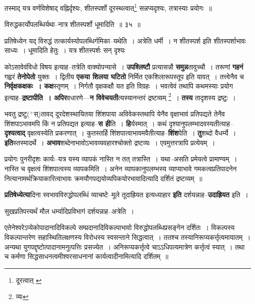 \documentclass[article,12pt,a4paper]{memoir}
\newcommand{\add}[1]{($^{+}$#1)}
\begin{document}
	  \pstart तस्माद् यत्र वर्णविशेषाद् वह्निर्दृश्यः, शीतस्पर्शो दूरस्थत्वात्\footnote{दूरत्वात् \cite{dp-msB} \cite{dp-msD}} सन्नप्यदृश्यः, तत्रास्याः प्रयोगः ॥
	\pend
       
	  \bigskip
	  \begingroup
	

	  \pstart विरुद्धकार्योपलब्धिर्यथा--नात्र शीतस्पर्शो धूमादिति ॥ ३५ ॥
	\pend
      
	  \endgroup
	 

	  \pstart प्रतिषेध्येन यद् विरुद्धं तत्कार्यस्योपलब्धिर्गमिका--यथेति । अत्रेति धर्मी । न शीतस्पर्श इति शीतस्पर्शाभावः साध्यः । धूमादिति हेतुः । यत्र शीतस्पर्शः सन् दृश्यः
	\pend
      
	  \endgroup
	

	  \pstart कोऽसावेवंविधो विषय इत्याह--तत्रेति वाक्योपन्यासे । \textbf{उपश्लिष्टौ} प्रत्यासन्नौ \textbf{समुन्न}तावुच्चौ । तरूणां \textbf{गहनं} गह्वरं \textbf{तेनोपेतो} युक्तः । द्वितीय \textbf{एकया शिलया घटितो} निर्मित एकशिलारूपस्तूप इति यावत् । तत्त्वेनैव च \textbf{निर्वृक्षकक्षकः । कक्ष}स्तृणम् । निर्गतौ वृक्षकक्षौ यत इति विग्रहः । भवत्वेवं तथापि कथमस्याः प्रयोग इत्याह--\textbf{द्रष्टापीति । अपिर}वधारणे—\textbf{न विवेचयती}त्यस्यानन्तरं द्रष्टव्यम् \footnote{व्यः} । \textbf{तस्य} तादृशस्य द्रष्टुः ।
	\pend
      

	  \pstart भवतु द्रष्टु\add{स्}तावद् दूरदेशस्थायितया शिंशपाया अविवेकस्तथापि येनैव वृक्षाभावं प्रतिपद्यते तेनैव शिंशपाऽभावमपि किं न प्रतिपद्यत इत्याह--\textbf{स ही}ति । \textbf{हि}र्यस्मात् । कथं दृश्यानुपलम्भादवस्यतीत्याह--\textbf{दृश्यत्वाद्} वृक्षत्वस्येति प्रकरणात् । कुतस्तर्हि शिंशपा\leavevmode{}त्वाभावमवैतीत्याह--\textbf{शिंश}पेति । \textbf{तु}शब्दो वैधर्म्ये । \textbf{इति}स्तस्मादर्थे । \textbf{अभाव}शब्देनाभावोऽभावव्यवहारश्चोक्तो द्रष्टव्यः । एवमुत्तरत्रापि प्रत्येयम् ।
	\pend
      

	  \pstart प्रयोगः पुनरीदृशः कार्यः--यत्र यस्य व्यापकं नास्ति न तत् तत्रास्ति । यथा--असति प्रमेयत्वे प्रामाण्यम् । नास्ति च वृक्षत्वं शिंशपात्वस्य व्यापकमिति । अनेन व्यापकानुपलम्भस्य व्याप्याभावे गमकत्वप्रतिपादनेन नित्यानामर्थक्रियाकारित्वाभावः क्रमयौगपद्ययोव्यपिकयोरभावादित्यादि दर्शितं द्रष्टव्यम् ॥
	\pend
      

	  \pstart \textbf{प्रतिषेध्येत्या}दिना स्वभावविरुद्धोपलब्धिं व्याचष्टे--मूले तूदाह्रियत इत्यध्याहार \textbf{इति} दर्शयन्नाह--\textbf{उदाह्रियत} इति ।
	\pend
      

	  \pstart सुखप्रतिपत्त्यर्थं मौल धर्म्यादिप्रविभागं दर्शयन्नाह--अत्रेति ।
	\pend
      

	  \pstart एतेनेश्वरेऽप्येकोपादानादिविकल्पे सम्प्रदानादिविकल्पाभावो विरुद्धोपलब्धिप्रसङ्गेन दर्शितः । विकल्पस्य विकल्पान्तरेण सहास्थितिलक्षणस्य विरोधस्य स्वसन्ताने सिद्धत्वात् । ततश्च तस्यानिरूप्यकर्त्तृत्वमायातम् । अन्यथा युगपद्दृष्टोत्पादानामनुत्पत्तिः प्रसज्येत । अनिरूप्यकर्त्तृत्वे चाऽऽधिपत्यमात्रेण कर्त्तृत्वं स्यात् । तथा च कर्मणा सिद्धसाधनत्वमीश्वरसाधनानां कार्यत्वादीनामित्यादि दर्शितम् ॥
	\pend
      
\end{document}
